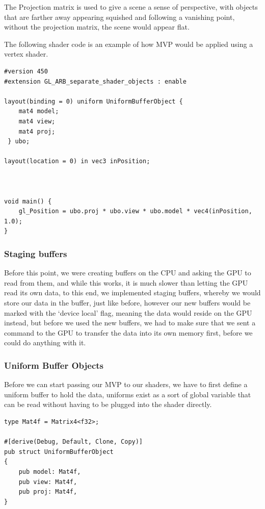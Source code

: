 \documentclass[../report.tex]{subfiles}
\begin{document}
The Projection matrix is used to give a scene a sense of perspective, with objects that are farther away appearing squished and following a vanishing point, without the projection matrix, the scene would appear flat.

The following shader code is an example of how MVP would be applied using a vertex shader.

\begin{verbatim}
#version 450
#extension GL_ARB_separate_shader_objects : enable

layout(binding = 0) uniform UniformBufferObject {
    mat4 model;
    mat4 view;
    mat4 proj;
 } ubo;

layout(location = 0) in vec3 inPosition;



void main() {
    gl_Position = ubo.proj * ubo.view * ubo.model * vec4(inPosition, 1.0);
}
\end{verbatim}

\subsubsection{Staging buffers}
Before this point, we were creating buffers on the CPU and asking the GPU to read from them, and while this works, it is much slower than letting the GPU read its own data, to this end, we implemented staging buffers, whereby we would store our data in the buffer, just like before, however our new buffers would be marked with the `device local' flag, meaning the data would reside on the GPU instead, but before we used the new buffers, we had to make sure that we sent a command to the GPU to transfer the data into its own memory first, before we could do anything with it.

\subsubsection{Uniform Buffer Objects}
Before we can start passing our MVP to our shaders, we have to first define a uniform buffer to hold the data, uniforms exist as a sort of global variable that can be read without having to be plugged into the shader directly.

\begin{verbatim}
type Mat4f = Matrix4<f32>;

#[derive(Debug, Default, Clone, Copy)]
pub struct UniformBufferObject 
{
    pub model: Mat4f,
    pub view: Mat4f,
    pub proj: Mat4f,
}
\end{verbatim}
\end{document}

